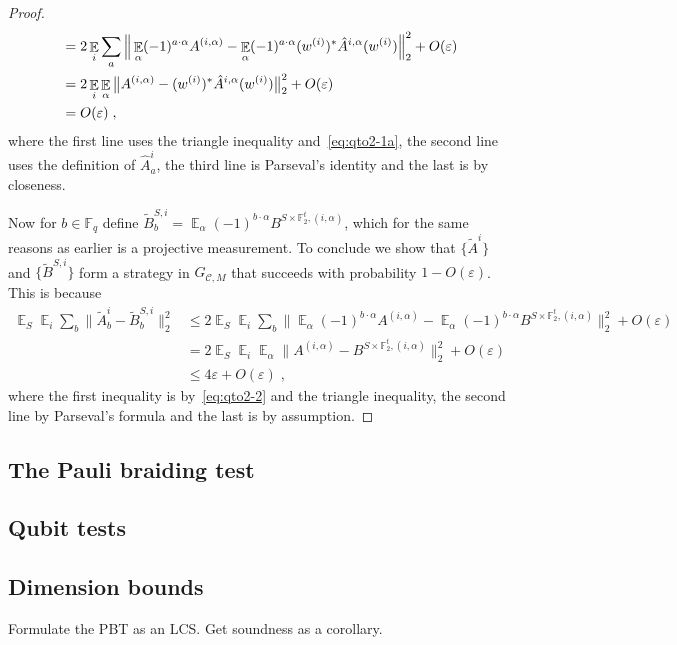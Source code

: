 \documentclass[11pt]{article}
\theoremstyle{definition}
\newcommand{\code}{\mathcal{C}}
\DeclareMathOperator*{\Expectation}{\mathbb{E}}
\newcommand{\Es}[1]{\Expectation_{#1}}
\newcommand{\F}{\ensuremath{\mathbb{F}}}
\newcommand{\eps}{\varepsilon}
\begin{document}
\begin{proof}
\begin{align}
&=  2\Es{i} \sum_a \Big\| \Es{\alpha} (-1)^{a\cdot \alpha} A^{(i,\alpha)} -   \Es{\alpha} (-1)^{a\cdot \alpha} (w^{(i)})^* \hat{A}^{i,\alpha} (w^{(i)}) \Big\|_2^2+ O(\eps) \notag\\
&= 2\Es{i} \Es{\alpha} \big\| A^{(i,\alpha)} -    (w^{(i)})^* \hat{A}^{i,\alpha} (w^{(i)}) \big\|_2^2+ O(\eps)\notag\\
&= O(\eps)\;, \label{eq:qto2-2}
\end{align}
where the first line uses the triangle inequality and~\eqref{eq:qto2-1a}, the second line uses the definition of $\hat{A}^i_a$, the third line is Parseval's identity and the last is by closeness. 

Now for $b\in \F_q$ define $\tilde{B}^{S,i}_b= \Es{\alpha} (-1)^{b\cdot \alpha} B^{S\times \F_2^t,(i,\alpha)}$, which for the same reasons as earlier is a projective measurement. 
To conclude we show that $\{\tilde{A}^{i}\}$ and $\{\tilde{B}^{S,i}\}$ form a strategy in $G_{\code, M}$ that succeeds with probability $1-O(\eps)$. This is because
\begin{align*}
\Es{S}\Es{i} \sum_b \big\| \tilde{A}^i_b - \tilde{B}^{S,i}_b \big\|_2^2
&\leq 2\Es{S}\Es{i} \sum_b \Big\| \Es{\alpha} (-1)^{b\cdot \alpha} {A}^{(i,\alpha)} - \Es{\alpha} (-1)^{b\cdot \alpha} B^{S\times \F_2^t,(i,\alpha)}\Big\|_2^2 + O(\eps)\\
&= 2\Es{S}\Es{i} \Es{\alpha}\big\|  {A}^{(i,\alpha)} -  B^{S\times \F_2^t,(i,\alpha)}\big\|_2^2 + O(\eps)\\
&\leq 4\eps + O(\eps)\;,
\end{align*}
where the first inequality is by~\eqref{eq:qto2-2} and the triangle inequality, the second line by Parseval's formula and the last is by assumption. 
\end{proof}

\subsection{The Pauli braiding test}

\subsection{Qubit tests}

\subsection{Dimension bounds}


Formulate the PBT as an LCS. Get soundness as a corollary. 







\notesendofpaper
\end{document}
